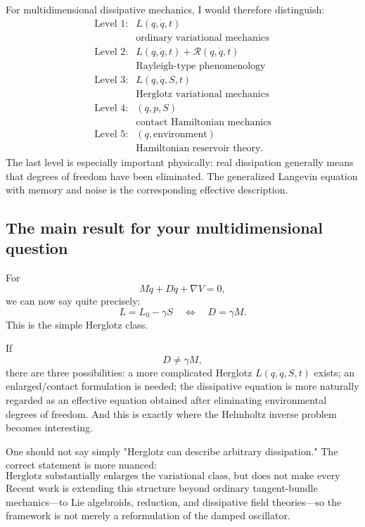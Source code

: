 For multidimensional dissipative mechanics, I would therefore distinguish:
$$ \boxed{ 
\begin{array}{ll} 
\text{Level 1:}& L(q,\dot q,t) \\[1mm]
&\text{ordinary variational mechanics} \\[4mm]
\text{Level 2:}& L(q,\dot q,t)+\mathcal R(q,\dot q,t) \\[1mm]
&\text{Rayleigh-type phenomenology} \\[4mm]
\text{Level 3:}& L(q,\dot q,S,t) \\[1mm] 
&\text{Herglotz variational mechanics} \\[4mm]
\text{Level 4:}& (q,p,S) \\[1mm] 
&\text{contact Hamiltonian mechanics} \\[4mm] 
\text{Level 5:}& (q,\text{environment}) \\[1mm]
&\text{Hamiltonian reservoir theory}. 
\end{array}} $$
The last level is especially important physically: real dissipation generally means that degrees of freedom have been eliminated. The generalized Langevin equation with memory and noise is the corresponding effective description.

\subsection{The main result for your multidimensional question}

For $$ M\ddot q+D\dot q+\nabla V=0, $$
we can now say quite precisely:
$$ \boxed{ L=L_0-\gamma S \quad\Longleftrightarrow\quad D=\gamma M. } $$
This is the simple Herglotz class.

If $$ D\neq\gamma M, $$ 
there are three possibilities:
a more complicated Herglotz \(L(q,\dot q,S,t)\) exists;
an enlarged/contact formulation is needed;
the dissipative equation is more naturally regarded as an effective equation obtained after eliminating environmental degrees of freedom.
And this is exactly where the Helmholtz inverse problem becomes interesting.

One should not say simply "Herglotz can describe arbitrary dissipation." The correct statement is more nuanced:
$$ \boxed{ \text{Herglotz substantially enlarges the variational class, but does not make every arbitrary force law variational.} } $$
Recent work is extending this structure beyond ordinary tangent-bundle mechanics—to Lie algebroids, reduction, and dissipative field theories—so the framework is not merely a reformulation of the damped oscillator.

